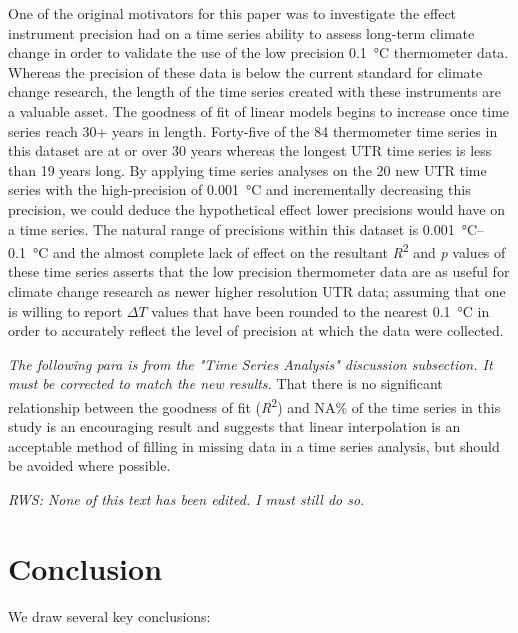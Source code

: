 \documentclass{ametsoc}
\begin{document}
One of the original motivators for this paper was to investigate the effect instrument precision had on a time series ability to assess long-term climate change in order to validate the use of the low precision \SI{0.1}{\degreeCelsius} thermometer data. Whereas the precision of these data is below the current standard for climate change research, the length of the time series created with these instruments are a valuable asset. The goodness of fit of linear models begins to increase once time series reach 30+ years in length. Forty-five of the 84 thermometer time series in this dataset are at or over 30 years whereas the longest UTR time series is less than 19 years long. By applying time series analyses on the 20 new UTR time series with the high-precision of \SI{0.001}{\degreeCelsius} and incrementally decreasing this precision, we could deduce the hypothetical effect lower precisions would have on a time series. The natural range of precisions within this dataset is \SIrange{0.001}{0.1}{\degreeCelsius} and the almost complete lack of effect on the resultant \emph{R}\textsuperscript{2} and \emph{p} values of these time series asserts that the low precision thermometer data are as useful for climate change research as newer higher resolution UTR data; assuming that one is willing to report $\Delta T$ values that have been rounded to the nearest \SI{0.1}{\degreeCelsius} in order to accurately reflect the level of precision at which the data were collected.

\emph{The following para is from the "Time Series Analysis" discussion subsection. It must be corrected to match the new results.}
That there is no significant relationship between the goodness of fit (\emph{R}\textsuperscript{2}) and NA\% of the time series in this study is an encouraging result and suggests that linear interpolation is an acceptable method of filling in missing data in a time series analysis, but should be avoided where possible.


\emph{RWS: None of this text has been edited. I must still do so.}
\section{Conclusion}
We draw several key conclusions:
\end{document}
